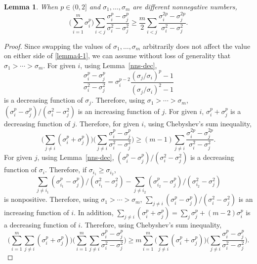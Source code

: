 \documentclass[11pt, a4paper]{article}
\newtheorem{lemma}{Lemma}
\theoremstyle{remark}
\begin{document}
\begin{lemma}\label{chebyshev-2}
When $p\in(0,2]$ and $\sigma_1,\dots,\sigma_m$ are different nonnegative numbers,
\begin{equation}
\Big(\sum_{i=1}^m\sigma_i^p\Big)\sum_{i<j}\frac{\sigma_i^p-\sigma_j^p}{\sigma_i^2-\sigma_j^2}\ge\frac{m}{2}\sum_{i<j}\frac{\sigma_i^{2p}-\sigma_j^{2p}}{\sigma_i^2-\sigma_j^2}. \label{lemma4-1}
\end{equation}
\end{lemma}
\begin{proof}
Since swapping the values of $\sigma_1, \ldots, \sigma_m$ arbitrarily does not affect the value on either side of \eqref{lemma4-1}, we can assume without loss of generality that $\sigma_1>\cdots>\sigma_m$.
For given $i$, using Lemma~\ref{nns-dec}, $$\frac{\sigma_i^p-\sigma_j^p}{\sigma_i^2-\sigma_j^2}=\sigma_i^{p-2}\frac{(\sigma_j/\sigma_i)^p-1}{(\sigma_j/\sigma_i)^2-1}$$ is a decreasing function of $\sigma_j$. Therefore, using $\sigma_1>\cdots>\sigma_m$, $(\sigma_i^p-\sigma_j^p)/(\sigma_i^2-\sigma_j^2)$ is an increasing function of $j$. For given $i$, $\sigma_i^p+\sigma_j^p$ is a decreasing function of $j$. Therefore, for given $i$, using Chebyshev's sum inequality, 
\begin{equation}
    \Big(\sum_{j\neq i}(\sigma_i^p+\sigma_j^p)\Big)\Big(\sum_{j\neq i}\frac{\sigma_i^p-\sigma_j^p}{\sigma_i^2-\sigma_j^2}\Big)\ge (m-1)\sum_{j\neq i}\frac{\sigma_i^{2p}-\sigma_j^{2p}}{\sigma_i^{2}-\sigma_j^2}. \label{cheb-1}
\end{equation} 
For given $j$, using Lemma~\ref{nns-dec}, $(\sigma_i^p-\sigma_j^p)/(\sigma_i^2-\sigma_j^2)$ is a decreasing function of $\sigma_i$. Therefore, if $\sigma_{i_1}\ge\sigma_{i_2}$, $$\sum_{j\neq i_1}(\sigma_{i_1}^p-\sigma_j^p)/(\sigma_{i_1}^2-\sigma_j^2)-\sum_{j\neq i_2}(\sigma_{i_2}^p-\sigma_j^p)/(\sigma_{i_2}^2-\sigma_j^2)$$ is nonpositive. Therefore, using $\sigma_1>\cdots>\sigma_m$, $\sum_{j\neq i}(\sigma_i^p-\sigma_j^p)/(\sigma_i^2-\sigma_j^2)$ is an increasing function of $i$. In addition, $\sum_{j\neq i}(\sigma_i^p+\sigma_j^p)=\sum_{j}\sigma_j^p+(m-2)\sigma_i^p$ is a decreasing function of $i$. Therefore, using Chebyshev's sum inequality,
\begin{equation}
    \Big(\sum_{i=1}^m\sum_{j\neq i}(\sigma_i^p+\sigma_j^p)\Big)\Big(\sum_{i=1}^m\sum_{j\neq i}\frac{\sigma_i^p-\sigma_j^p}{\sigma_i^2-\sigma_j^2}\Big) \ge m\sum_{i=1}^m\Big(\sum_{j\neq i}(\sigma_i^p+\sigma_j^p)\Big)\Big(\sum_{j\neq i}\frac{\sigma_i^p-\sigma_j^p}{\sigma_i^2-\sigma_j^2}\Big). \label{cheb-2}
\end{equation}

\end{proof}
\end{document}
